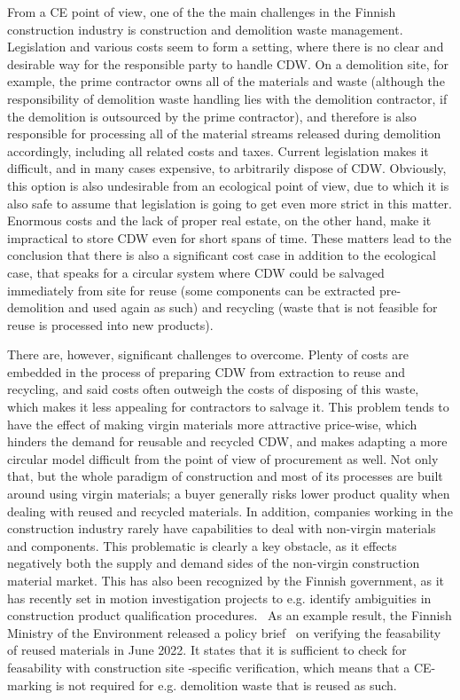 \documentclass[english, 12pt, a4paper, sci, utf8, a-2b, online]{aaltothesis}
\begin{document}
From a CE point of view, one of the the main challenges in the Finnish construction industry is construction and demolition waste management. Legislation and various costs seem to
form a setting, where there is no clear and desirable way for the responsible party to handle CDW. On a demolition site, for example,
the prime contractor owns all of the materials and waste (although the responsibility of demolition waste handling lies with the demolition contractor, if the demolition is outsourced
by the prime contractor), and therefore is also responsible for processing all of the material streams released during demolition accordingly, including all related costs and taxes.
Current legislation makes it difficult, and in many cases expensive, to arbitrarily dispose of CDW. Obviously, this option is also undesirable from an ecological point of view, due to
which it is also safe to assume that legislation is going to get even more strict in this matter. Enormous costs and the lack of proper real estate, on the other hand, make it impractical
to store CDW even for short spans of time. These matters lead to the conclusion that there is also a significant cost case in addition to the ecological case, that speaks for a circular
system where CDW could be salvaged immediately from site for reuse (some components can be extracted pre-demolition and used again as such) and recycling (waste that is not feasible
for reuse is processed into new products).

There are, however, significant challenges to overcome. Plenty of costs are embedded in the process of preparing CDW from extraction to reuse and recycling, and said costs often
outweigh the costs of disposing of this waste, which makes it less appealing for contractors to salvage it. This problem tends to have the effect of making virgin materials
more attractive price-wise, which hinders the demand for reusable and recycled CDW, and makes adapting a more circular model difficult from the point of view of procurement as well.
Not only that, but the whole paradigm of construction and most of its processes are built around using virgin materials; a buyer generally risks lower product quality when dealing with
reused and recycled materials. In addition, companies working in the construction industry rarely have capabilities to deal with non-virgin materials and components.
This problematic is clearly a key obstacle, as it effects negatively both the supply and demand sides of the non-virgin construction material market.
This has also been recognized by the Finnish government, as it has recently set in motion investigation projects to e.g. identify
ambiguities in construction product qualification procedures.~\cite{zhu} As an example result, the Finnish Ministry of the Environment released a policy brief~\cite{tahtinen} on verifying the
feasability of reused materials in June 2022. It states that it is sufficient to check for feasability with construction site -specific verification, which means that a CE-marking is not
required for e.g. demolition waste that is reused as such.
\end{document}
